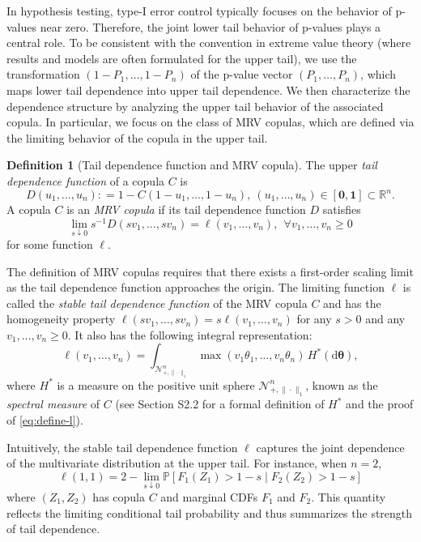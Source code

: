 \documentclass[12pt]{article}
\theoremstyle{plain}
\theoremstyle{plain}
\theoremstyle{definition}
\newtheorem{defn}{Definition}[section]
\renewcommand{\Pr}{\mathbb{P}}
\newcommand{\R}{\mathbb{R}}
\newcommand{\intd}{\mathrm{d}}
\newcommand{\punitsphereone}[1]{\mathcal{N}_{+,\|\cdot\|_1}^{#1}}
\begin{document}
In hypothesis testing, type-I error control typically focuses on the behavior of p-values near zero. Therefore, the joint lower tail behavior of p-values plays a central role.   
To be consistent with the convention in extreme value theory (where results and models are often formulated for the upper tail), we use the transformation $(1 - P_1, \dots, 1 - P_n)$ of the p-value vector $(P_1, \dots, P_n)$, which maps lower tail dependence into upper tail dependence. We then characterize the dependence structure by analyzing the upper tail behavior of the associated copula. In particular, we focus on the class of MRV copulas, which are defined via the limiting behavior of the copula in the upper tail.


\begin{defn}[Tail dependence function and MRV copula] 
\label{def:mrv-copula}
The upper \emph{tail dependence function} of a copula $C$ is
\[
D(u_1,\dots,u_n): = 1 - C(1 - u_1, \dots, 1 - u_n),~\left(u_1,\dots,u_n\right)\in[\mathbf{0},\mathbf{1}]\subset\R^n. 
\]
A copula $C$ is an \emph{MRV copula} if its tail dependence function $D$ satisfies
\begin{equation*}
    \lim_{s\downarrow0} s^{-1} D\left(s v_1,\dots,sv_n\right) = \ell(v_1,\dots,v_n),~~ \forall v_1,\dots,v_n\geq 0  
\end{equation*}
for some function $\ell$. 
\end{defn}

The definition of MRV copulas requires that there exists a first-order scaling limit as the tail dependence function approaches the origin. The limiting function $\ell$ is called the \emph{stable tail dependence function} of the MRV copula $C$ and has the homogeneity property $\ell(sv_1, \dots, sv_n)=s\ell(v_1,\dots, v_n)$ for any $s>0$ and any $v_1, \dots, v_n \geq 0$. It also has the following integral representation:
\begin{equation}
\label{eq:define-l}
\ell(v_1,\dots,v_n) = \int_{\punitsphereone{n}} \max(v_1 \theta_1, \dots, v_n \theta_n) \,  H^*(\intd\bm{\theta}),
\end{equation}
where $H^*$ is a measure on the positive unit sphere $\punitsphereone{n}$, known as the \emph{spectral measure} of $C$ (see Section S2.2 for a formal definition of $H^*$ and the proof of \eqref{eq:define-l}). 

Intuitively, the stable tail dependence function $\ell$ captures the joint dependence of the multivariate distribution at the upper tail. For instance, when $n = 2$, 
$$\ell(1, 1) = 2 - \lim_{s\downarrow0}\Pr[F_1(Z_1)>1-s\mid F_2(Z_2)>1-s]$$
where $(Z_1, Z_2)$ has copula $C$ and marginal CDFs $F_1$ and $F_2$. This quantity reflects the limiting conditional tail probability and thus summarizes the strength of tail dependence.
\end{document}
